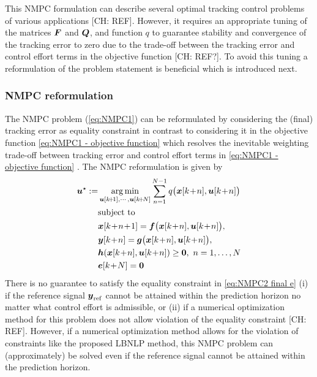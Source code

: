\documentclass[journal]{IEEEtranTIE}
\newcommand{\CHHA}[1]{{\color{red} [CH: #1]}} %
\begin{document}
This NMPC formulation can describe several optimal tracking control problems of various applications \CHHA{REF}. However, it requires an appropriate tuning of the matrices $\boldsymbol{F}$ and $\boldsymbol{Q}$, and function $q$ to guarantee stability and convergence of the tracking error to zero due to the trade-off between the tracking error and control effort terms in the objective function \CHHA{REF?}.
To avoid this tuning a reformulation of the problem statement is beneficial which is introduced next. 

\subsubsection{NMPC reformulation}
%
The NMPC problem (\ref{eq:NMPC1}) can be reformulated by considering the (final) tracking error as equality constraint in contrast to considering it in the objective function \eqref{eq:NMPC1 - objective function} which resolves the inevitable weighting trade-off between tracking error and control effort terms in \eqref{eq:NMPC1 - objective function} \cite{2013_Hackl_Ismultiple-objectivemodel-predictivecontroloptimal}. The NMPC reformulation is given by
%
\begin{subequations}\label{eq:NMPC2}
\begin{align}
\mv{u}^\star:=&\mathop {\rm arg\min }\limits_{\mv{u}[k\!+\!1], \cdots ,\mv{u}[k\!+\!N]}   \sum\limits_{n = 1}^{N - 1}  q\big( \mv{x}[k\!+\!n],\mv{u}[k\!+\!n] \big) \\
\nonumber
&{\rm{subject\ to}}\\
&\mv{x}[k\!+\!n\!+\!1] = \mv{f}\big( \mv{x}[k\!+\!n] ,\mv{u}[k\!+\!n] \big), \\ &\mv{y}[k\!+\!n]  = \mv{g}\big(\mv{x}[k\!+\!n], \mv{u}[k\!+\!n] \big), \\
&\mv{h}(\mv{x}[k\!+\!n],\mv{u}[k\!+\!n]) \ge \mv{0},\ n = 1, \ldots ,N\\
&\mv{e}[k\!+\!N] = \mv{0} \label{eq:NMPC2 final e}
\end{align}
\end{subequations}
%
There is no guarantee to satisfy the equality constraint in \eqref{eq:NMPC2 final e} (i) if the reference signal $\boldsymbol{y}_{\mathrm{ref}}$ cannot be attained within the prediction horizon no matter what control effort is admissible, or (ii) if a numerical optimization method for this problem does not allow violation of the equality constraint \CHHA{REF}. 
However, if a numerical optimization method allows for the violation of constraints like the proposed LBNLP method, this NMPC problem can (approximately) be solved even if the reference signal cannot be attained within the prediction horizon. 
\end{document}
